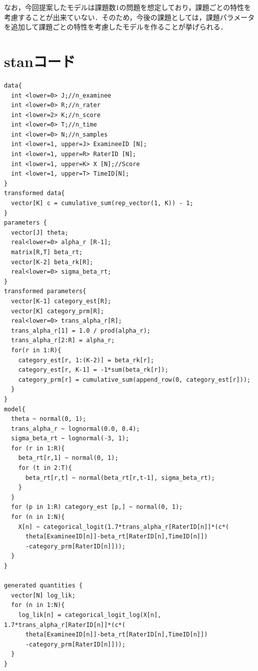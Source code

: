 \documentclass[a4paper,11pt,oneside,openany]{jsbook}
\begin{document}
なお，今回提案したモデルは課題数1の問題を想定しており，課題ごとの特性を考慮することが出来ていない．そのため，今後の課題としては，課題パラメータを追加して課題ごとの特性を考慮したモデルを作ることが挙げられる．

\newpage
\appendix
\chapter{stanコード}
\begin{lstlisting}[basicstyle=\ttfamily\footnotesize, frame=single]
data{
  int <lower=0> J;//n_examinee
  int <lower=0> R;//n_rater
  int <lower=2> K;//n_score
  int <lower=0> T;//n_time
  int <lower=0> N;//n_samples
  int <lower=1, upper=J> ExamineeID [N];
  int <lower=1, upper=R> RaterID [N];
  int <lower=1, upper=K> X [N];//Score
  int <lower=1, upper=T> TimeID[N];
}
transformed data{
  vector[K] c = cumulative_sum(rep_vector(1, K)) - 1;
}
parameters {
  vector[J] theta;
  real<lower=0> alpha_r [R-1];
  matrix[R,T] beta_rt;
  vector[K-2] beta_rk[R];
  real<lower=0> sigma_beta_rt;
}
transformed parameters{
  vector[K-1] category_est[R];
  vector[K] category_prm[R];
  real<lower=0> trans_alpha_r[R];
  trans_alpha_r[1] = 1.0 / prod(alpha_r);
  trans_alpha_r[2:R] = alpha_r;
  for(r in 1:R){
    category_est[r, 1:(K-2)] = beta_rk[r];
    category_est[r, K-1] = -1*sum(beta_rk[r]);
    category_prm[r] = cumulative_sum(append_row(0, category_est[r]));
  }
}
model{
  theta ~ normal(0, 1);
  trans_alpha_r ~ lognormal(0.0, 0.4);
  sigma_beta_rt ~ lognormal(-3, 1);
  for (r in 1:R){
    beta_rt[r,1] ~ normal(0, 1);
    for (t in 2:T){
      beta_rt[r,t] ~ normal(beta_rt[r,t-1], sigma_beta_rt);
    }
  }
  for (p in 1:R) category_est [p,] ~ normal(0, 1);
  for (n in 1:N){
    X[n] ~ categorical_logit(1.7*trans_alpha_r[RaterID[n]]*(c*(
      theta[ExamineeID[n]]-beta_rt[RaterID[n],TimeID[n]])
      -category_prm[RaterID[n]]));
  }
}

generated quantities {
  vector[N] log_lik;
  for (n in 1:N){
    log_lik[n] = categorical_logit_log(X[n], 1.7*trans_alpha_r[RaterID[n]]*(c*(
      theta[ExamineeID[n]]-beta_rt[RaterID[n],TimeID[n]])
      -category_prm[RaterID[n]]));
  }
}

\end{lstlisting}
\newpage



\end{document}
